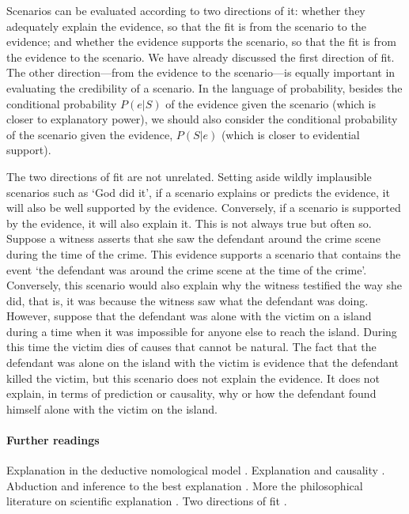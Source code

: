 \documentclass[10pt]{article}
\begin{document}
Scenarios can be evaluated according to two directions of it: whether they adequately explain the evidence, so that the fit is from 
the scenario to the evidence; and whether the evidence supports the scenario, so that the fit is from the evidence to the scenario.
We have already discussed the first direction of fit. The other direction---from the evidence to the scenario---is equally important in 
evaluating the credibility of a scenario. In the language of probability, besides the conditional probability $P(e|S)$ of the evidence 
given the scenario (which is closer to explanatory power), we should also consider the conditional probability of the 
scenario given the evidence, $P(S|e)$ (which is closer to evidential support).

The two directions of fit are not unrelated. Setting aside wildly implausible 
scenarios such as `God did it', if a scenario explains or predicts the evidence, it will also be well supported 
by the evidence. Conversely, if a scenario is supported by the evidence, it will also explain it. This is not always true but often so. 
Suppose a witness asserts that she saw the defendant around the crime scene during the time of the crime. This evidence supports a scenario that contains the event 
`the defendant was around the crime scene at the time of the crime'. Conversely, this scenario would also explain why 
the witness testified the way she did, that is, it was because the witness saw what the defendant was doing. However, suppose that the defendant was alone with the 
victim on a island during a time when it was impossible for anyone else to reach the island. During this time the victim dies of causes that cannot be natural. 
The fact that the defendant was alone on the island with the victim is evidence that the defendant killed the victim, but this scenario does 
not explain the evidence. It does not explain, in terms of prediction or causality, why or how the defendant 
found himself alone with the victim on the island. 






\paragraph{Further readings}

Explanation in the deductive nomological model \citep{hempelOppenhaim1948}. 
Explanation and causality \citep{salmon1984}. 
Abduction and inference to the best explanation \citep{lipton1991}.
More the philosophical literature on 
scientific explanation \citep{woodward2014}. 
Two directions of fit \citep{wells1992}.
\end{document}
